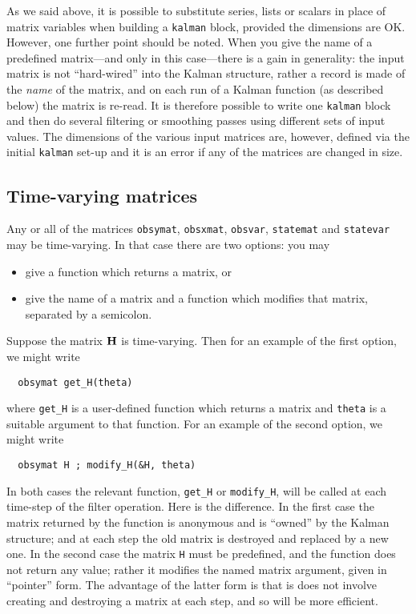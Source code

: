 \documentclass[a4paper]{article}
\newcommand{\obsmat}{\ensuremath\mathbf{H}}
\begin{document}
As we said above, it is possible to substitute series, lists or
scalars in place of matrix variables when building a \texttt{kalman}
block, provided the dimensions are OK.  However, one further point
should be noted.  When you give the name of a predefined matrix---and
only in this case---there is a gain in generality: the input matrix is
not ``hard-wired'' into the Kalman structure, rather a record is made
of the \textit{name} of the matrix, and on each run of a Kalman
function (as described below) the matrix is re-read.  It is therefore
possible to write one \texttt{kalman} block and then do several
filtering or smoothing passes using different sets of input values.
The dimensions of the various input matrices are, however, defined via
the initial \texttt{kalman} set-up and it is an error if any of the
matrices are changed in size.

\subsection{Time-varying matrices}

Any or all of the matrices \texttt{obsymat}, \texttt{obsxmat},
\texttt{obsvar}, \texttt{statemat} and \texttt{statevar} may be
time-varying.  In that case there are two options: you may

\begin{itemize}
\item give a function which returns a matrix, or
\item give the name of a matrix and a function which modifies that
  matrix, separated by a semicolon.
\end{itemize}

Suppose the matrix $\obsmat$ is time-varying.  Then for an example of
the first option, we might write
%
\begin{verbatim}
  obsymat get_H(theta)
\end{verbatim}
%
where \texttt{get\_H} is a user-defined function which returns a
matrix and \texttt{theta} is a suitable argument to that function.
For an example of the second option, we might write
%
\begin{verbatim}
  obsymat H ; modify_H(&H, theta)
\end{verbatim}

In both cases the relevant function, \verb+get_H+ or \verb+modify_H+,
will be called at each time-step of the filter operation.  Here is the
difference. In the first case the matrix returned by the function is
anonymous and is ``owned'' by the Kalman structure; and at each step
the old matrix is destroyed and replaced by a new one.  In the second
case the matrix \texttt{H} must be predefined, and the function does
not return any value; rather it modifies the named matrix argument,
given in ``pointer'' form.  The advantage of the latter form is that
is does not involve creating and destroying a matrix at each step, and
so will be more efficient.
\end{document}
